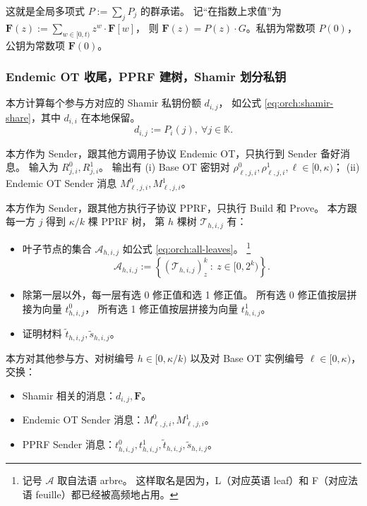 这就是全局多项式 $P:=\sum_j P_j$ 的群承诺。
记“在指数上求值”为 $\mathbf{F}(z) := \sum_{w\in[0,t)} z^w \cdot \mathbf{F}[w]$，
则 $\mathbf{F}(z) = P(z)\cdot G$。私钥为常数项 $P(0)$，公钥为常数项 $\mathbf{F}(0)$。

\subsubsection{Endemic OT 收尾，PPRF 建树，Shamir 划分私钥}

本方计算每个参与方对应的 Shamir 私钥份额 $d_{i,j}$，
如公式 \eqref{eq:orch:shamir-share}，其中 $d_{i,i}$ 在本地保留。
\begin{equation}
\label{eq:orch:shamir-share}\tag{shamir}
d_{i,j} := P_i(j), ~\forall j\in\mathbb{K}.
\end{equation}

本方作为 Sender，跟其他方调用子协议 Endemic OT，只执行到 Sender 备好消息。
输入为 $R_{j,i}^0, R_{j,i}^1$。
输出有
(i) Base OT 密钥对 $\rho^0_{\ell,j,i}, \rho^1_{\ell,j,i}, \ell\in[0, \kappa)$；
(ii) Endemic OT Sender 消息 $M_{\ell,j,i}^0, M_{\ell,j,i}^1$。

本方作为 Sender，跟其他方执行子协议 PPRF，只执行 Build 和 Prove。
本方跟每一方 $j$ 得到 $\kappa/k$ 棵 PPRF 树，
第 $h$ 棵树 $\mathcal{T}_{h,i,j}$ 有：
\begin{itemize}
\item
  叶子节点的集合 $\mathcal{A}_{h,i,j}$ 如公式 \eqref{eq:orch:all-leaves}。
  \footnote{记号 $\mathcal{A}$ 取自法语 arbre。
  这样取名是因为，L（对应英语 leaf）和 F（对应法语 feuille）都已经被高频地占用。}
  \begin{equation}
    \tag{all-leaves}\label{eq:orch:all-leaves}
    \mathcal{A}_{h,i,j} := \left\{\left(\mathcal{T}_{h,i,j}\right)^k_z ~:~ z\in[0, 2^k)\right\}.
  \end{equation}
\item
  除第一层以外，每一层有选 0 修正值和选 1 修正值。
  所有选 0 修正值按层拼接为向量 $t_{h,i,j}^0$，
  所有选 1 修正值按层拼接为向量 $t_{h,i,j}^1$。
\item
  证明材料 $\tilde t_{h,i,j}, \tilde s_{h,i,j}$。
\end{itemize}

本方对其他参与方、对树编号 $h \in [0, \kappa/k)$
以及对 Base OT 实例编号 $\ell \in [0, \kappa)$，交换：
\begin{itemize}
\item
  Shamir 相关的消息：$d_{i,j}, \mathbf{F}$。
\item
  Endemic OT Sender 消息：$M_{\ell,j,i}^0, M_{\ell,j,i}^1$。
\item
  PPRF Sender 消息：$t_{h,i,j}^0, t_{h,i,j}^1, \tilde t_{h,i,j}, \tilde s_{h,i,j}$。
\end{itemize}

